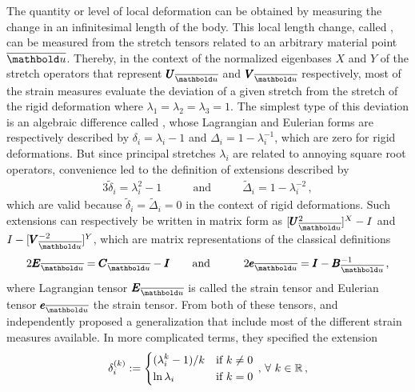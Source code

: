 The quantity or level of local deformation can be obtained by measuring the change in an infinitesimal length of the body. This local length change, called , can be measured from the stretch tensors related to an arbitrary material point $\overline{\vto{u}}$. Thereby, in the context of the normalized eigenbases $X$ and $Y$ of the stretch operators that represent $\tnr{U}_{\overline{\vto{u}}}$ and $\tnr{V}_{\overline{\vto{u}}}$ respectively, most of the strain measures evaluate the deviation of a given stretch from the stretch of the rigid deformation where $\lambda_1=\lambda_2=\lambda_3=1$. The simplest type of this deviation is an algebraic difference called , whose Lagrangian and Eulerian forms are respectively described by $\delta_i=\lambda_i-1$ and $\Delta_i=1-\lambda_i^{-1}$, which are zero for rigid deformations. But since principal stretches $\lambda_i$ are related to annoying square root operators, convenience led to the definition of extensions described by 
\begin{alignat}{3}
\tilde{\delta}_i=\lambda_i^2-1&\qquad \text{and}\qquad & \tilde{\Delta}_i=1-\lambda_i^{-2}\,,
\end{alignat}
which are valid because $\tilde{\delta}_i=\tilde{\Delta}_i=0$ in the context of rigid deformations. Such extensions can respectively be written in matrix form as $[\tnr{U}_{\overline{\vto{u}}}^2]^X-I$ and $I-[\tnr{V}_{\overline{\vto{u}}}^{-2}]^Y$, which are matrix representations of the classical definitions 
\begin{alignat}{3}
2\tnr{E}_{\overline{\vto{u}}}=\tnr{C}_{\overline{\vto{u}}}-\tnr{I}&\qquad \text{and}\qquad & 2\tnr{e}_{\overline{\vto{u}}}=\tnr{I}-\tnr{B}_{\overline{\vto{u}}}^{-1}\,,
\end{alignat}
where Lagrangian tensor $\tnr{E}_{\overline{\vto{u}}}$ is called the  strain tensor and Eulerian tensor $\tnr{e}_{\overline{\vto{u}}}$ the  strain tensor. From both of these tensors, \cite{doyle_1956} and \cite{seth_1961} independently proposed a generalization that include most of the different strain measures available. In more complicated terms, they specified the extension
\begin{alignat}{3}
\delta_i^{(k)}:=\begin{dcases}
(\lambda_i^k-1)/k &  \text{if } k\neq 0\\
\ln{\lambda_i}&  \text{if } k=0
\end{dcases}\,,\, \forall \,\, k\in\mathbb{R}\,,
\end{alignat}
